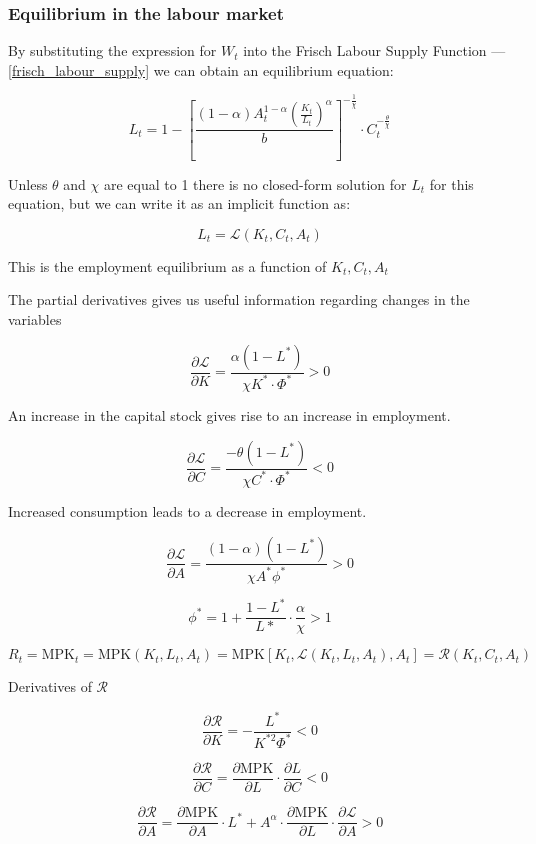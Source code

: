 \subsubsection{Equilibrium in the labour market}

By substituting the expression for $W_t$ into the Frisch Labour Supply Function --- \ref{frisch_labour_supply} we can obtain an equilibrium equation:

\begin{equation*}
        L_t = 1 - \left[ \frac{(1 - \alpha ) A_t^{1-\alpha} \left( \frac{K_t}{L_t} \right)^{\alpha}}{b} \right] ^{-\frac{1}{\chi}}  \cdot C_t^{- \frac{\theta}{\chi}}
\end{equation*}

Unless $\theta$ and $\chi$ are equal to 1 there is no closed-form solution for $L_t$ for this equation, but we can write it as an implicit function as:

$$
L_t = \mathcal{L} (K_t, C_t, A_t)
$$

This is the employment equilibrium as a function of $K_t, C_t, A_t$

The partial derivatives gives us useful information regarding changes in the variables

$$
\frac{\partial \mathcal{L}}{\partial K} = \frac{\alpha (1- L^*)}{\chi K^* \cdot \Phi^*} > 0
$$

An increase in the capital stock gives rise to an increase in employment.

$$
\frac{\partial \mathcal{L}}{\partial C} = \frac{- \theta ( 1 - L^*)}{\chi C^* \cdot \Phi ^* } < 0
$$

Increased consumption leads to a decrease in employment.

$$
\frac{\partial \mathcal{L}}{\partial A} = \frac{(1 - \alpha) (1 - L^*)}{\chi A^* \phi^*} > 0
$$

$$
\phi^* = 1 + \frac{1-L^*}{L*} \cdot \frac{\alpha}{\chi} > 1
$$

$$
R_t = \text{MPK}_t = \text{MPK}(K_t, L_t, A_t) = \text{MPK} \left[ K_t, \mathcal{L}(K_t, L_t, A_t), A_t \right] = \mathcal{R} (K_t, C_t, A_t)
$$

Derivatives of $\mathcal{R}$

$$
\frac{\partial \mathcal{R}}{\partial K} = - \frac{L^*}{K^{* 2} \Phi^*} < 0
$$

$$
\frac{\partial \mathcal{R}}{\partial C} =  \frac{\partial \text{MPK}}{\partial L} \cdot \frac{\partial L}{\partial C} < 0
$$

$$
\frac{\partial \mathcal{R}}{\partial A} =  \frac{\partial \text{MPK}}{\partial A} \cdot L^* + A^\alpha \cdot \frac{\partial \text{MPK}}{\partial L} \cdot \frac{\partial \mathcal{L}}{\partial A} > 0
$$




